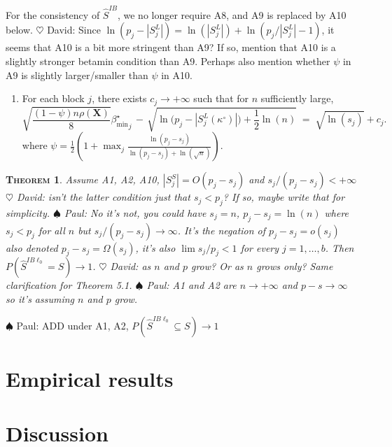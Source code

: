 \documentclass[aos]{imsart}
\theoremstyle{plain}
\newtheorem{thm}{\textsc{Theorem}}[section]
\newcommand{\david}[1]{{\small{\color{blue} \sf $\heartsuit$ David: #1}}}
\newcommand{\paul}[1]{{\small{\color{green} \sf $\spadesuit$ Paul: #1}}}
\newcommand{\bs}{\boldsymbol}
\begin{document}
For the consistency of $\hat{S}^{IB}$, we no longer require A8, and A9 is replaced by A10 below.
\david{Since $\ln(p_j - |S_j^L|)= \ln(|S_j^L|) + \ln(p_j/|S_j^L| -1)$, it seems that A10 is a bit more stringent than A9? If so, mention that A10 is a slightly stronger betamin condition than A9. Perhaps also mention whether $\psi$ in A9 is slightly larger/smaller than $\psi$ in A10.}
\begin{enumerate}[start=10,label={(A\arabic*)}]
\item For each block $j$, there exists $c_{j}\to +\infty$ such that for $n$ sufficiently large, %
\begin{equation*}
        \sqrt{\frac{ (1-\psi)n\rho(\bs X)}{8}}{\beta_{\min}^{\star}}_j \,- \,\sqrt{\ln\big(p_j-|S^L_j(\kappa^{\circ})|\big)+\frac12\ln(n)} \;=\; \sqrt{\ln(s_j)} + c_{j} .
    \end{equation*}
where  $\psi=\frac12(1+\max_j \frac{\ln(p_j-s_j)}{\ln(p_j-s_j)+\ln(\sqrt{n})})$.
\end{enumerate}


\begin{thm}\label{theo:informedl0consist}
    Assume A1, A2, A10, $|S^S_j|=O(p_j-s_j)$ and $s_j / (p_j-s_j)<+\infty$ \david{isn't the latter condition just that $s_j < p_j$? If so, maybe write that for simplicity.}\paul{No it's not, you could have $s_j=n$, $p_j-s_j=\ln(n)$ where $s_j<p_j$ for all $n$ but $s_j/(p_j-s_j)\to \infty$. It's the negation of $p_j-s_j=o(s_j)$ also denoted $p_j-s_j = \Omega(s_j)$, it's also $\lim s_j/p_j <1$ } for every $j=1,\ldots,b$. Then 
$P(\hat{S}^{IB\ell_0} = S) \to 1$. \david{as $n$ and $p$ grow? Or as $n$ grows only? Same clarification for Theorem 5.1.} \paul{A1 and A2 are $n\to+\infty$ and $p-s\to\infty$ so it's assuming $n$ and $p$ grow.}
\end{thm}
\paul{ADD under A1, A2, $P(\hat{S}^{IB\ell_0} \subseteq S) \to 1$}

\section{Empirical results}\label{sec:simulation}

\section{Discussion}\label{sec:discussion}
\end{document}
